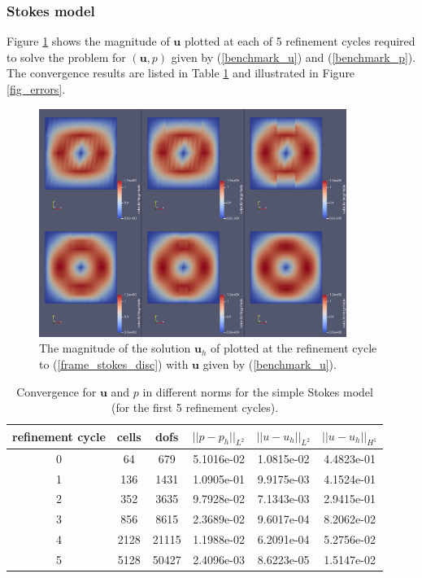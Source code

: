 \documentclass[12pt,a4paper]{article}
\theoremstyle{definition}
\begin{document}
\subsubsection{Stokes model}
Figure \ref{fig_stokes_sol}  shows the magnitude of $\textbf{u}$ plotted at each of 5 refinement cycles required to solve the problem for $\left(\textbf{u}, p\right)$ given by (\ref{benchmark_u}) and (\ref{benchmark_p}).  The convergence results are listed in Table \ref{tablebenchmark_convergence} and illustrated in Figure \ref{fig_errors}.
\begin{figure}[H]
	\centering
	\includegraphics[width=10cm]{stokes_cg_velocities}
	\caption{The magnitude of the solution $\textbf{u}_h$ of plotted at the refinement cycle to (\ref{frame_stokes_disc}) with $\textbf{u}$ given by (\ref{benchmark_u}).}
	\label{fig_stokes_sol}
\end{figure}
\begin{table}[H]
	\begin{center}
		\begin{tabular}{|c|c|c|c|c|c|} \hline
			refinement cycle & cells & dofs & $||p-p_h||_{L^2}$ & $||u-u_h||_{L^2}$ & $||u-u_h||_{H^1}$\\ \hline
			0 & 64 & 679 & 5.1016e-02 & 1.0815e-02 & 4.4823e-01\\ \hline
			1 & 136 & 1431 & 1.0905e-01 & 9.9175e-03 & 4.1524e-01\\ \hline
			2 & 352 & 3635 & 9.7928e-02 & 7.1343e-03 & 2.9415e-01\\ \hline
			3 & 856 & 8615 & 2.3689e-02 & 9.6017e-04 & 8.2062e-02\\ \hline
			4 & 2128 & 21115 & 1.1988e-02 & 6.2091e-04 & 5.2756e-02\\ \hline
			5 & 5128 & 50427 & 2.4096e-03 & 8.6223e-05 & 1.5147e-02\\ \hline
		\end{tabular}
		\caption{Convergence for $\textbf{u}$ and $p$ in different norms for the simple Stokes model (for the first 5 refinement cycles).}
		\label{tablebenchmark_convergence}
	\end{center}
\end{table}
\end{document}
